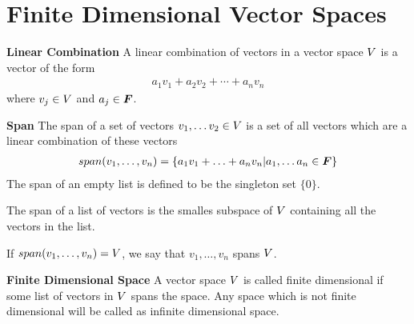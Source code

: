\documentclass[../../linear_algebra.tex]{subfiles}
\begin{document}
\section{Finite Dimensional Vector Spaces}
\textbf{Linear Combination}\newline
A linear combination of vectors in a vector space $V$ is a vector of the form
\begin{align*}
    a_{1}v_{1} + a_{2}v_{2} + \cdots + a_{n}v_{n}
\end{align*}
where $v_{j} \in V$ and $a_{j} \in \bm{F}$.\newline

\textbf{Span}\newline
The span of a set of vectors $v_{1}, \ldots v_{2} \in V$ is a set of all vectors which are a linear combination of these vectors
\begin{align*}
    span(v_{1}, \ldots, v_{n}) = \{ a_{1}v_{1} + \ldots + a_{n}v_{n} | a_{1}, \ldots a_{n} \in \bm{F} \}
\end{align*}
The span of an empty list is defined to be the singleton set $\{ 0 \}$.\newline

The span of a list of vectors is the smalles subspace of $V$ containing all the vectors in the list.\newline

If $span(v_{1}, \ldots, v_{n}) = V$, we say that $v_{1}, \ldots, v_{n}$ spans $V$.\newline

\textbf{Finite Dimensional Space}\newline
A vector space $V$ is called finite dimensional if some list of vectors in $V$ spans the space. Any space which is not finite dimensional will be called as infinite dimensional space.\newline
\end{document}
